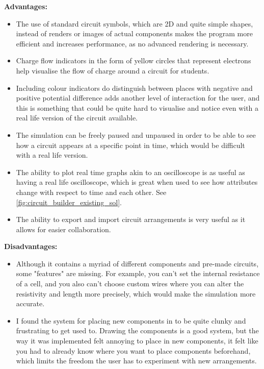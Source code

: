\documentclass[tikz, 11pt]{article}
\begin{document}
                \textbf{Advantages:}
                \begin{itemize}
                    \item The use of standard circuit symbols, which are 2D and quite simple shapes, instead of renders or images of actual components makes the program more efficient and increases performance, as no advanced rendering is necessary. 
                    \item Charge flow indicators in the form of yellow circles that represent electrons help visualise the flow of charge around a circuit for students. 
                    \item Including colour indicators do distinguish between places with negative and positive potential difference adds another level of interaction for the user, and this is something that could be quite hard to visualise and notice even with a real life version of the circuit available.
                    \item The simulation can be freely paused and unpaused in order to be able to see how a circuit appears at a specific point in time, which would be difficult with a real life version. 
                    \item The ability to plot real time graphs akin to an oscilloscope is as useful as having a real life oscilloscope, which is great when used to see how attributes change with respect to time and each other. See \autoref{fig:circuit_builder_existing_sol}.
                    \item The ability to export and import circuit arrangements is very useful as it allows for easier collaboration.
                \end{itemize}

                \textbf{Disadvantages:}
                \begin{itemize}
                    \item Although it contains a myriad of different components and pre-made circuits, some "features" are missing. For example, you can't set the internal resistance of a cell, and you also can't choose custom wires where you can alter the resistivity and length more precisely, which would make the simulation more accurate.
                    \item I found the system for placing new components in to be quite clunky and frustrating to get used to. Drawing the components is a good system, but the way it was implemented felt annoying to place in new components, it felt like you had to already know where you want to place components beforehand, which limits the freedom the user has to experiment with new arrangements. 
                \end{itemize}
\end{document}
